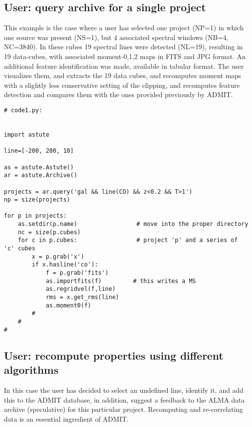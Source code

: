 \documentclass[preprint]{aastex} %
\begin{document}
\subsection{User: query archive for a single project}

This example is the case where a user has selected one project (NP=1)
in which one source was present (NS=1), but 4 associated 
spectral windows (NB=4, NC=3840). In these cubes 19 spectral lines 
were detected (NL=19),
resulting in 19 data-cubes, with associated moment-0,1,2 maps in FITS
and JPG format. An additional feature identification was made, available
in tabular format.  The user visualizes them, and extracts the 19
data cubes, and recomputes moment maps with a slightly less conservative
setting of the clipping, and recomputes feature detection and compares
them with the ones provided previously by ADMIT.

\footnotesize
\begin{verbatim}
# code1.py:


import astute

line=[-200, 200, 10]

as = astute.Astute()
ar = astute.Archive()

projects = ar.query('gal && line(CO) && z<0.2 && T>1')
np = size(projects)

for p in projects:
    as.setdir(p.name)                 # move into the proper directory
    nc = size(p.cubes)
    for c in p.cubes:                 # project 'p' and a series of 'c' cubes
        x = p.grab('x')
        if x.hasline('co'):
            f = p.grab('fits')
            as.importfits(f)         # this writes a MS
            as.regridvel(f,line)
            rms = x.get_rms(line)
            as.moment0(f)
        #
    #
#

\end{verbatim}
\normalsize


\subsection{User: recompute properties using different algorithms}

In this case the user has decided to select an undefined line, identify it, 
and add this to the ADMIT database, in addition, suggest a feedback to the ALMA data archive
(speculative) for this particular project.
Recomputing and re-correlating data is an essential ingredient of ADMIT.
\end{document}
